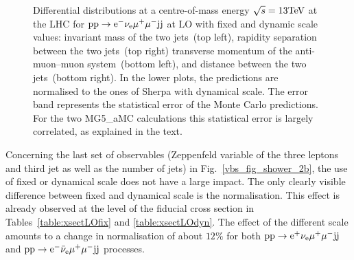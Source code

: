 \documentclass[11pt]{cernrep}
\begin{document}
\begin{figure}[htbp]
\begin{center}
\caption{Differential distributions at a centre-of-mass energy $\sqrt{s}=13{\rm TeV}$ at the LHC for ${\rm p} {\rm p}
  \to {\rm e}^-  \nu_{\rm e}  \mu^+ \mu^- {\rm j} {\rm j}$ at LO with fixed and dynamic scale values:  
                invariant mass of the two jets~(top left),
                rapidity separation between the two jets~(top right)
                transverse momentum of the anti-muon--muon system~(bottom left), and
                distance between the two jets~(bottom right).
                In the lower plots, the predictions are normalised to the ones of {\sc Sherpa} with
                dynamical scale. The error band represents
                the statistical error of the Monte Carlo predictions. For the two {\sc MG5\_aMC}
                calculations this statistical error is largely correlated, as explained in the text.}
\label{vbs_fig_shower_2a}
\end{center}
\end{figure}

Concerning the last set of observables (Zeppenfeld variable of the three leptons and third jet as well as the number of jets) in Fig.~\ref{vbs_fig_shower_2b}, the use of fixed or dynamical scale does not have a large impact.
The only clearly visible difference between fixed and dynamical scale is the normalisation.
This effect is already observed at the level of the fiducial cross section in Tables~\ref{table:xsectLOfix} and \ref{table:xsectLOdyn}.
The effect of the different scale amounts to a change in normalisation of about $12\%$ for both ${\rm p}{\rm p}\to{\rm e}^+\nu_{\rm e}\mu^+\mu^-{\rm j}{\rm j}$ and ${\rm p}{\rm p}\to{\rm e}^-\bar\nu_{\rm e}\mu^+\mu^-{\rm j}{\rm j}$ processes.
\end{document}
